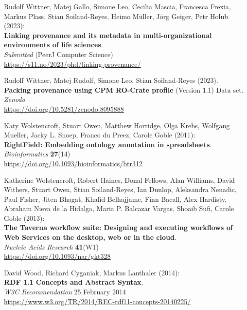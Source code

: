 \begin{thebibliography}{9}
Rudolf Wittner, Matej Gallo, Simone Leo, Cecilia Mascia, Francesca Frexia, Markus Plass, Stian Soiland-Reyes, Heimo Müller, Jörg Geiger, Petr Holub (2023):\\
\textbf{Linking provenance and its metadata in multi-organizational environments of life sciences}.\\
\emph{Submitted} (PeerJ Computer Science)\\
\url{https://s11.no/2023/phd/linking-provenance/}

Rudolf Wittner, Matej Rudolf, Simone Leo, Stian Soiland-Reyes (2023).\\
\textbf{Packing provenance using CPM RO-Crate profile} (Version 1.1)
Data set.\\
\emph{Zenodo}\\
\url{https://doi.org/10.5281/zenodo.8095888}

Katy Wolstencroft, Stuart Owen, Matthew Horridge, Olga Krebs, Wolfgang Mueller, Jacky L. Snoep, Franco du Preez, Carole Goble (2011): \\
\textbf{RightField: Embedding ontology annotation in spreadsheets}. \\
\emph{Bioinformatics} \textbf{27}(14) \\
\url{https://doi.org/10.1093/bioinformatics/btr312}

Katherine Wolstencroft, Robert Haines, Donal Fellows, Alan Williams,
David Withers, Stuart Owen, Stian Soiland-Reyes, Ian Dunlop, Aleksandra
Nenadic, Paul Fisher, Jiten Bhagat, Khalid Belhajjame, Finn Bacall, Alex
Hardisty, Abraham Nieva de la Hidalga, Maria P. Balcazar Vargas, Shoaib
Sufi, Carole Goble (2013): \\
\textbf{The {Taverna} workflow suite: Designing
and executing workflows of {Web Services} on the desktop, web or in the
cloud}. \\
\emph{Nucleic Acids Research} \textbf{41}(W1) \\
\url{https://doi.org/10.1093/nar/gkt328}

David Wood, Richard Cyganiak, Markus Lanthaler (2014): \\
\textbf{RDF 1.1 Concepts and Abstract Syntax}.\\
\emph{W3C Recommendation} 25 February 2014\\
\url{https://www.w3.org/TR/2014/REC-rdf11-concepts-20140225/}


\end{thebibliography}
